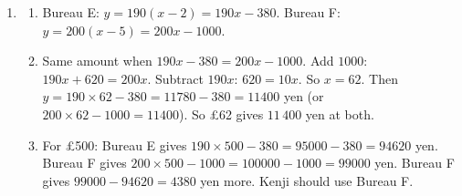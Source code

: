 \documentclass[12pt,a4paper]{article}
\newcommand{\heading}[1]{\vspace{8pt}{\large\bfseries #1}\par\vspace{2pt}}
\begin{document}
\begin{enumerate}[label=\textbf{Q\arabic*.}, leftmargin=*]
\item
\begin{enumerate}
\item Bureau E: \(y=190(x-2)=190x-380\). Bureau F: \(y=200(x-5)=200x-1000\).
\item Same amount when \(190x-380=200x-1000\). Add \(1000\): \(190x+620=200x\). Subtract \(190x\): \(620=10x\). So \(x=62\). Then \(y=190\times62-380=11780-380=11400\) yen (or \(200\times62-1000=11400\)). So \pounds62 gives \(11\,400\) yen at both.
\item For \pounds500: Bureau E gives \(190\times500-380=95000-380=94620\) yen. Bureau F gives \(200\times500-1000=100000-1000=99000\) yen. Bureau F gives \(99000-94620=4380\) yen more. Kenji should use Bureau F.
\end{enumerate}
\end{enumerate}

\heading{Part 5: Challenges}
\end{document}
